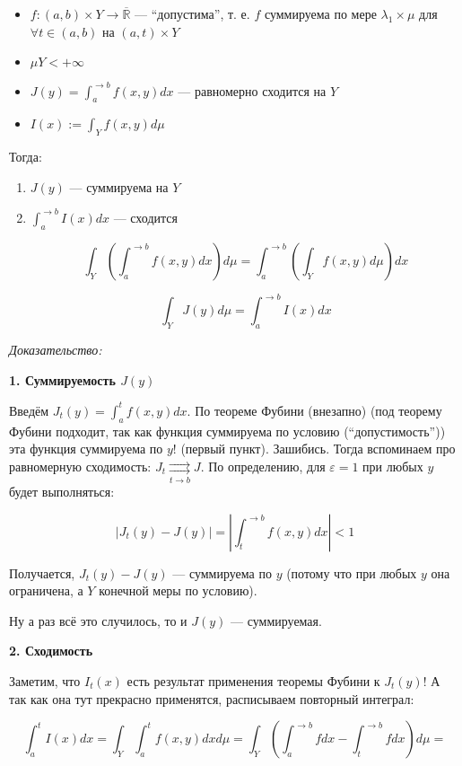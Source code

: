 \documentclass{article}
\def\rsh#1{\underset{#1}{\rightrightarrows}}
\def\rinf{\overline{\mathbb{R}}}
\begin{document}
\begin{itemize}
    \item $f: (a, b) \times Y \rightarrow \rinf$ --- ``допустима'', т. е. $f$ суммируема по мере $\lambda_1 \times \mu$ для $\forall t \in (a, b)$ на $(a, t) \times Y$ 
    \item $\mu Y < +\infty$
    \item $J(y) = \int_a^{\rightarrow b} f(x, y) dx$ --- равномерно сходится на $Y$
    \item $I(x) := \int_{Y} f(x, y) d\mu$
\end{itemize}

Тогда:

\begin{enumerate}
    \item $J(y)$ --- суммируема на $Y$
    \item $\int_a^{\rightarrow b} I(x) dx$ --- сходится
    
    \[\int_{Y} \left( \int_a^{\rightarrow b} f(x, y) dx\right) d\mu = \int_a^{\rightarrow b} \left( \int_{Y} f(x, y) d\mu\right) dx\]

    \[\int_{Y} J(y) d\mu = \int_a^{\rightarrow b} I(x) dx\]
\end{enumerate}

\textit{Доказательство:}

\textbf{1. Суммируемость $J(y)$}

Введём $J_t(y) = \int_a^t f(x, y) dx$. По теореме Фубини (внезапно) (под теорему Фубини подходит, так как функция суммируема по условию (``допустимость'')) эта функция суммируема по $y$! (первый пункт). Зашибись. Тогда вспоминаем про равномерную сходимость: $J_t \rsh{t \rightarrow b} J$. По определению, для $\varepsilon = 1$ при любых $y$ будет выполняться:

\[|J_t(y) - J(y)| = \left| \int_t^{\rightarrow b} f(x, y) dx\right| < 1\]

Получается, $J_t(y) - J(y)$ --- суммируема по $y$ (потому что при любых $y$ она ограничена, а $Y$ конечной меры по условию).

Ну а раз всё это случилось, то и $J(y)$ --- суммируемая.

\textbf{2. Сходимость}

Заметим, что $I_t(x)$ есть результат применения теоремы Фубини к $J_t(y)$! А так как она тут прекрасно применятся, расписываем повторный интеграл:

\[\int_a^t I(x) dx = \int_{Y} \int_a^t f(x, y) dx d\mu = \int_{Y} \left(\int_a^{\rightarrow b} f dx - \int_t^{\rightarrow b} fdx \right) d\mu = \]
\end{document}
